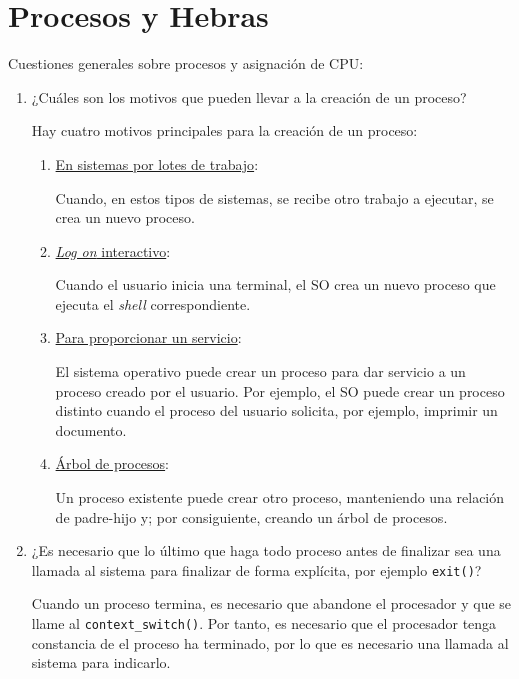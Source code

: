 \section{Procesos y Hebras}

\begin{ejercicio}
    Cuestiones generales sobre procesos y asignación de CPU:
    \begin{enumerate}
        \item ¿Cuáles son los motivos que pueden llevar a la creación de un proceso?

        Hay cuatro motivos principales para la creación de un proceso:
        \begin{enumerate}
            \item \ul{En sistemas por lotes de trabajo}:

            Cuando, en estos tipos de sistemas, se recibe otro trabajo a ejecutar, se crea un nuevo proceso.

            \item \ul{\emph{Log on} interactivo}:

            Cuando el usuario inicia una terminal, el SO crea un nuevo proceso que ejecuta el \emph{shell} correspondiente.

            \item \ul{Para proporcionar un servicio}:

            El sistema operativo puede crear un proceso para dar servicio a un proceso creado por el usuario. Por ejemplo, el SO puede crear un proceso distinto cuando el proceso del usuario solicita, por ejemplo, imprimir un documento.

            \item \ul{Árbol de procesos}:

            Un proceso existente puede crear otro proceso, manteniendo una relación de padre-hijo y; por consiguiente, creando un árbol de procesos. 
        \end{enumerate}
        
        \item ¿Es necesario que lo último que haga todo proceso antes de finalizar sea una llamada al sistema para finalizar de forma explícita, por ejemplo \verb|exit()|?

        Cuando un proceso termina, es necesario que abandone el procesador y que se llame al \verb|context_switch()|. Por tanto, es necesario que el procesador tenga constancia de el proceso ha terminado, por lo que es necesario una llamada al sistema para indicarlo.



\end{enumerate}
\end{ejercicio}
